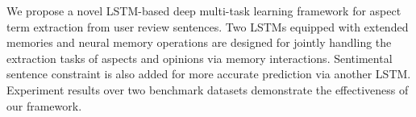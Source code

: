 We propose a novel LSTM-based deep multi-task learning framework for aspect term extraction from user review sentences. Two LSTMs equipped with extended memories and neural memory operations are designed for jointly handling the extraction tasks of aspects and opinions via memory interactions. Sentimental sentence constraint is also added for more accurate prediction via another LSTM. Experiment results over two benchmark datasets demonstrate the effectiveness of our framework.
